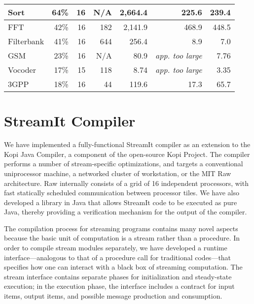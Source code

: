 \begin{table*}
\begin{tabular}{l||r|r|r|r||r||r}
Sort   & 64\% & 16  & N/A &  2,664.4 & 225.6 & 239.4 \\ \hline
FFT    & 42\% & 16  & 182 &  2,141.9 & 468.9 & 448.5  \\ \hline
Filterbank & 
       41\% & 16  &  644 &   256.4  & 8.9 & 7.0   \\ \hline
GSM    & 23\% & 16 & N/A &    80.9  & {\it app. too large} & 7.76 \\ \hline
Vocoder& 17\% & 15  & 118 &     8.74  & {\it app. too large} & 3.35  \\ \hline
3GPP   & 18\% & 16  & 44 &   119.6  & 17.3  & 65.7   \\ \hline
\end{tabular}
\end{table*}

\section{StreamIt Compiler}
\label{sec:compiler}

We  have  implemented  a  fully-functional  StreamIt  compiler  as  an
extension to  the Kopi Java  Compiler, a component of  the open-source
Kopi   Project\cite{kopi}.   The   compiler  performs   a   number  of
stream-specific optimizations, and targets a conventional uniprocessor
machine,  a   networked  cluster  of  workstation,  or   the  MIT  Raw
architecture.   Raw internally consists  of a  grid of  16 independent
processors,  with  fast  statically  scheduled  communication  between
processor tiles\cite{rawshort}.   We have also developed  a library in
Java that  allows StreamIt code to  be executed as  pure Java, thereby
providing a verification mechanism for the output of the compiler.

The compilation process for streaming programs contains many novel
aspects because the basic unit of computation is a stream rather than a
procedure.  In order to compile stream modules separately, we have
developed a runtime interface---analogous to that of a procedure call for
traditional codes---that specifies how one can interact with a black box
of streaming computation.  The stream interface contains separate phases
for initialization and steady-state execution; in the execution phase,
the interface includes a contract for input items, output items, and
possible message production and consumption.


